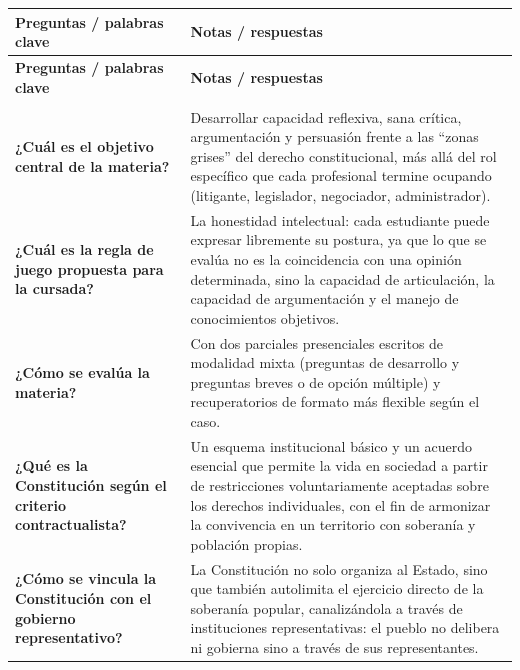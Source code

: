\documentclass[12pt,oneside]{book}
\begin{document}
\small
\renewcommand{\arraystretch}{1.3}
\begin{longtable}{
    >{\raggedright\arraybackslash}p{}
    >{\raggedright\arraybackslash}p{}
}
\toprule
\textbf{Preguntas / palabras clave} &
\textbf{Notas / respuestas} \\
\midrule
\endfirsthead

\toprule
\textbf{Preguntas / palabras clave} &
\textbf{Notas / respuestas} \\
\midrule
\endhead

\midrule
\multicolumn{2}{r}{\footnotesize\textit{Continúa en la página siguiente}} \\
\endfoot

\bottomrule
\endlastfoot

\textbf{¿Cuál es el objetivo central de la materia?} &
Desarrollar capacidad reflexiva, sana crítica, argumentación y persuasión frente a las ``zonas grises'' del derecho constitucional, más allá del rol específico que cada profesional termine ocupando (litigante, legislador, negociador, administrador). \\

\textbf{¿Cuál es la regla de juego propuesta para la cursada?} &
La honestidad intelectual: cada estudiante puede expresar libremente su postura, ya que lo que se evalúa no es la coincidencia con una opinión determinada, sino la capacidad de articulación, la capacidad de argumentación y el manejo de conocimientos objetivos. \\

\textbf{¿Cómo se evalúa la materia?} &
Con dos parciales presenciales escritos de modalidad mixta (preguntas de desarrollo y preguntas breves o de opción múltiple) y recuperatorios de formato más flexible según el caso. \\

\textbf{¿Qué es la Constitución según el criterio contractualista?} &
Un esquema institucional básico y un acuerdo esencial que permite la vida en sociedad a partir de restricciones voluntariamente aceptadas sobre los derechos individuales, con el fin de armonizar la convivencia en un territorio con soberanía y población propias. \\

\textbf{¿Cómo se vincula la Constitución con el gobierno representativo?} &
La Constitución no solo organiza al Estado, sino que también autolimita el ejercicio directo de la soberanía popular, canalizándola a través de instituciones representativas: el pueblo no delibera ni gobierna sino a través de sus representantes. \\


\end{longtable}
\end{document}
